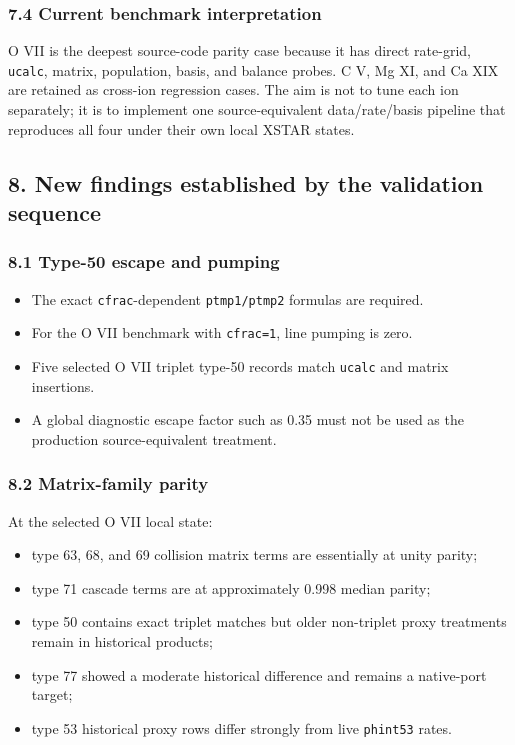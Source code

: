 \documentclass[
  10pt,
]{article}
\newcommand{\passthrough}[1]{#1}
\providecommand{\tightlist}{%
  \setlength{\itemsep}{0pt}\setlength{\parskip}{0pt}}
\begin{document}
\subsubsection{7.4 Current benchmark
interpretation}\label{current-benchmark-interpretation}

O VII is the deepest source-code parity case because it has direct
rate-grid, \passthrough{\lstinline!ucalc!}, matrix, population, basis,
and balance probes. C V, Mg XI, and Ca XIX are retained as cross-ion
regression cases. The aim is not to tune each ion separately; it is to
implement one source-equivalent data/rate/basis pipeline that reproduces
all four under their own local XSTAR states.

\subsection{8. New findings established by the validation
sequence}\label{new-findings-established-by-the-validation-sequence}

\subsubsection{8.1 Type-50 escape and
pumping}\label{type-50-escape-and-pumping}

\begin{itemize}
\tightlist
\item
  The exact \passthrough{\lstinline!cfrac!}-dependent
  \passthrough{\lstinline!ptmp1/ptmp2!} formulas are required.
\item
  For the O VII benchmark with \passthrough{\lstinline!cfrac=1!}, line
  pumping is zero.
\item
  Five selected O VII triplet type-50 records match
  \passthrough{\lstinline!ucalc!} and matrix insertions.
\item
  A global diagnostic escape factor such as 0.35 must not be used as the
  production source-equivalent treatment.
\end{itemize}

\subsubsection{8.2 Matrix-family parity}\label{matrix-family-parity}

At the selected O VII local state:

\begin{itemize}
\tightlist
\item
  type 63, 68, and 69 collision matrix terms are essentially at unity
  parity;
\item
  type 71 cascade terms are at approximately 0.998 median parity;
\item
  type 50 contains exact triplet matches but older non-triplet proxy
  treatments remain in historical products;
\item
  type 77 showed a moderate historical difference and remains a
  native-port target;
\item
  type 53 historical proxy rows differ strongly from live
  \passthrough{\lstinline!phint53!} rates.
\end{itemize}
\end{document}
